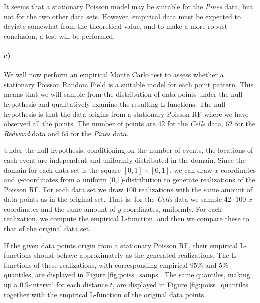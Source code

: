 It seems that a stationary Poisson model may be suitable for the \textit{Pines} data, but not for the two other data sets. However, empirical data must be expected to deviate somewhat from the theoretical value, and to make a more robust conclusion, a test will be performed.

\paragraph{c)}
We will now perform an empirical Monte Carlo test to assess whether a stationary Poisson Random Field is a suitable model for each point pattern. This means that we will sample from the distribution of data points under the null hypothesis and qualitatively examine the resulting L-functions. The null hypothesis is that the data origins from a stationary Poisson RF where we have observed all the points. The number of points are $42$ for the \textit{Cells} data, $62$ for the \textit{Redwood} data and $65$ for the \textit{Pines} data.

Under the null hypothesis, conditioning on the number of events, the locations of each event are independent and uniformly distributed in the domain. Since the domain for each data set is the square $[0,1] \times [0,1]$, we can draw $x$-coordinates and $y$-coordinates from a uniform (0,1)-distribution to generate realizations of the Poisson RF. For each data set we draw $100$ realizations with the same amount of data points as in the original set. That is, for the \textit{Cells} data we sample $42\cdot 100$ $x$-coordinates and the same amount of $y$-coordinates, uniformly. For each realization, we compute the empirical L-function, and then we compare these to that of the original data set.

If the given data points origin from a stationary Poisson RF, their empirical L-functions should behave approximately as the generated realizations. The L-functions of these realizations, with corresponding empirical $95\%$ and $5\%$ quantiles, are displayed in Figure \ref{fig:poiss_samps}. The same quantiles, making up a $0.9$-interval for each distance $t$, are displayed in Figure \ref{fig:poiss_quantiles} together with the empirical L-function of the original data points.

